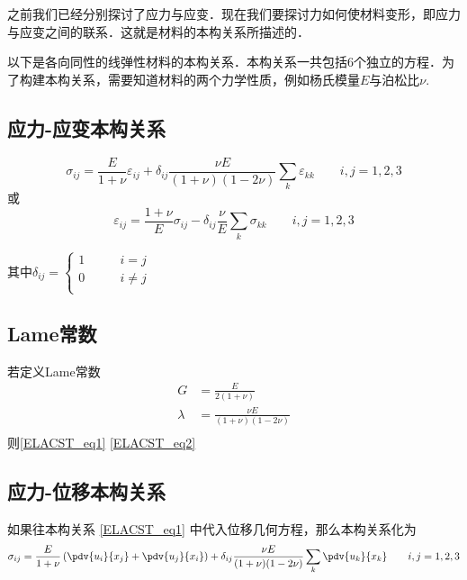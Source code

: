 
\begin{issues}
\issueDraft
\end{issues}

之前我们已经分别探讨了应力与应变．现在我们要探讨力如何使材料变形，即应力与应变之间的联系．这就是材料的本构关系所描述的．

以下是各向同性的线弹性材料的本构关系．本构关系一共包括$6$个独立的方程．为了构建本构关系，需要知道材料的两个力学性质，例如杨氏模量$E$与泊松比$\nu$.

\subsection{应力-应变本构关系}
\begin{equation}\label{ELACST_eq1}
\sigma_{ij}=\frac{E}{1+\nu}\varepsilon_{ij}+\delta_{ij}\frac{\nu E}{(1+\nu)(1-2\nu)}\sum_k\varepsilon_{kk}\qquad i,j=1,2,3
\end{equation}
或
\begin{equation}\label{ELACST_eq2}
\varepsilon_{ij}=\frac{1+\nu}{E}\sigma_{ij}-\delta_{ij}\frac{\nu}{E}\sum_k\sigma_{kk} \qquad i,j=1,2,3
\end{equation}

其中$\delta_{ij} = \left \{
\begin{aligned}
1 &\qquad i = j\\
0 &\qquad i \ne j\\
\end{aligned}
\right.
$

\subsection{Lame常数}
若定义Lame常数
\begin{equation}
\begin{aligned}
G&=\frac{E}{2(1+\nu)}\\
\lambda &= \frac{\nu E}{(1+\nu)(1-2\nu)}\\
\end{aligned}
\end{equation}
则\autoref{ELACST_eq1} \autoref{ELACST_eq2} 

\subsection{应力-位移本构关系}
如果往本构关系 \autoref{ELACST_eq1} 中代入位移几何方程，那么本构关系化为
\begin{equation}
\sigma_{ij}=\frac{E}{1+\nu}\left(\pdv{u_i}{x_j}+\pdv{u_j}{x_i}\right)
+\delta_{ij}\frac{\nu E}{(1+\nu)(1-2\nu)}\sum_k\pdv{u_k}{x_k}\qquad i,j=1,2,3
\end{equation}
